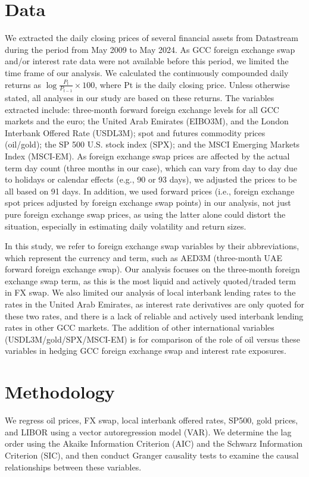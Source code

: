 \documentclass[12pt]{article}
\begin{document}
\begin{sloppypar}
\section{Data}
We extracted the daily closing prices of several financial assets from Datastream during the period from May 2009 to May 2024. As GCC foreign exchange swap and/or interest rate data were not available before this period, we limited the time frame of our analysis. We calculated the continuously compounded daily returns as $\log \frac{P_t}{P_{t-1}}\times 100$, where Pt is the daily closing price. Unless otherwise stated, all analyses in our study are based on these returns. The variables extracted include: three-month forward foreign exchange levels for all GCC markets and the euro; the United Arab Emirates (EIBO3M), and the London Interbank Offered Rate (USDL3M); spot and futures commodity prices (oil/gold); the SP 500 U.S. stock index (SPX); and the MSCI Emerging Markets Index (MSCI-EM). As foreign exchange swap prices are affected by the actual term day count (three months in our case), which can vary from day to day due to holidays or calendar effects (e.g., 90 or 93 days), we adjusted the prices to be all based on 91 days. In addition, we used forward prices (i.e., foreign exchange spot prices adjusted by foreign exchange swap points) in our analysis, not just pure foreign exchange swap prices, as using the latter alone could distort the situation, especially in estimating daily volatility and return sizes. 

In this study, we refer to foreign exchange swap variables by their abbreviations, which represent the currency and term, such as AED3M (three-month UAE forward foreign exchange swap). Our analysis focuses on the three-month foreign exchange swap term, as this is the most liquid and actively quoted/traded term in FX swap. We also limited our analysis of local interbank lending rates to the rates in  the United Arab Emirates, as interest rate derivatives are only quoted for these two rates, and there is a lack of reliable and actively used interbank lending rates in other GCC markets. The addition of other international variables (USDL3M/gold/SPX/MSCI-EM) is for comparison of the role of oil versus these variables in hedging GCC foreign exchange swap and interest rate exposures.

\newpage
\section{Methodology}
We regress oil prices, FX swap, local interbank offered rates, SP500, gold prices, and LIBOR using a vector autoregression model (VAR). We determine the lag order using the Akaike Information Criterion (AIC) and the Schwarz Information Criterion (SIC), and then conduct Granger causality tests to examine the causal relationships between these variables.


\end{sloppypar}
\end{document}
